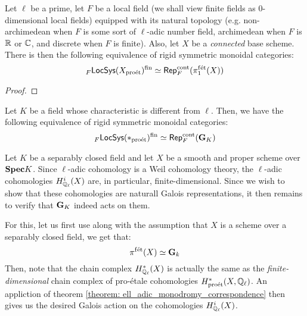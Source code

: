             \begin{theorem} \label{theorem: ell_adic_monodromy_correspondence}
                Let $\ell$ be a prime, let $F$ be a local field (we shall view finite fields as $0$-dimensional local fields) equipped with its natural topology (e.g. non-archimedean when $F$ is some sort of $\ell$-adic number field, archimedean when $F$ is $\mathbb{R}$ or $\mathbb{C}$, and discrete when $F$ is finite). Also, let $X$ be a \textit{connected} base scheme. There is then the following equivalence of rigid symmetric monoidal categories:
                    $${}_F\mathsf{LocSys}(X_{\mathrm{pro\acute{e}t}})^{\mathrm{fin}} \simeq \mathsf{Rep}_F^{\mathrm{cont}}(\pi_1^{\mathrm{f\acute{e}t}}(X))$$
            \end{theorem}
                \begin{proof}
                    
                \end{proof}
            \begin{corollary} \label{coro: continuous_galois_representations_as_lisse_sheaves}
                Let $K$ be a field whose characteristic is different from $\ell$. Then, we have the following equivalence of rigid symmetric monoidal categories:
                    $${}_F\mathsf{LocSys}(*_{\mathrm{pro\acute{e}t}})^{\mathrm{fin}} \simeq \mathsf{Rep}_F^{\mathrm{cont}}(\mathbf{G}_K)$$
            \end{corollary}
            \begin{example} \label{example: etale_cohomologies_as_galois_representations}
                Let $K$ be a separably closed field and let $X$ be a smooth and proper scheme over $\mathbf{Spec} K$. Since $\ell$-adic cohomology is a Weil cohomology theory, the $\ell$-adic cohomologies $H^i_{\mathbb{Q}_{\ell}}(X)$ are, in particular, finite-dimensional. Since we wish to show that these cohomologies are naturall Galois representations, it then remains to verify that $\mathbf{G}_K$ indeed acts on them.
                            
                For this, let us first use \cite[\href{https://stacks.math.columbia.edu/tag/0BUM}{Tag 0BUM}]{stacks} along with the assumption that $X$ is a scheme over a separably closed field, we get that:
                    $$\pi^{\mathrm{f\acute{e}t}}(X) \simeq \mathbf{G}_k$$
                Then, note that the chain complex $H^*_{\mathbb{Q}_{\ell}}(X)$ is actually the same as the \textit{finite-dimensional} chain complex of pro-\'etale cohomologies $H^*_{\mathrm{pro\acute{e}t}}(X, \mathbb{Q}_{\ell})$. An appliction of theorem \ref{theorem: ell_adic_monodromy_correspondence} then gives us the desired Galois action on the cohomologies $H^i_{\mathbb{Q}_{\ell}}(X)$.
            \end{example}
            
